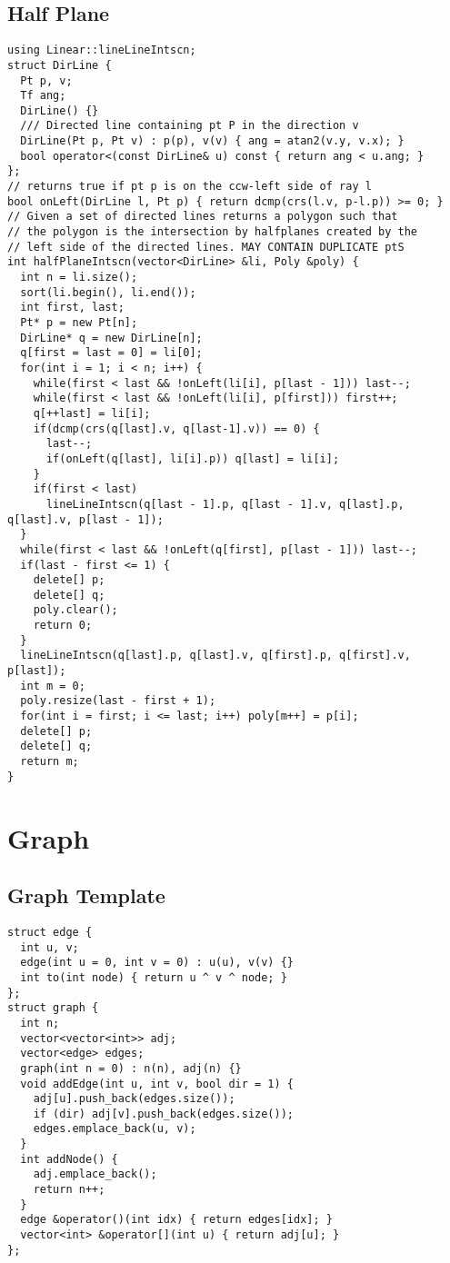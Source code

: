 \documentclass[FSZ,a4paper,onesided]{article}
\begin{document}
\begin{multicols*}{\COLS}
\subsection{Half Plane}
\begin{lstlisting}
using Linear::lineLineIntscn;
struct DirLine {
  Pt p, v;
  Tf ang;
  DirLine() {}
  /// Directed line containing pt P in the direction v
  DirLine(Pt p, Pt v) : p(p), v(v) { ang = atan2(v.y, v.x); }
  bool operator<(const DirLine& u) const { return ang < u.ang; }
};
// returns true if pt p is on the ccw-left side of ray l
bool onLeft(DirLine l, Pt p) { return dcmp(crs(l.v, p-l.p)) >= 0; }
// Given a set of directed lines returns a polygon such that
// the polygon is the intersection by halfplanes created by the
// left side of the directed lines. MAY CONTAIN DUPLICATE ptS
int halfPlaneIntscn(vector<DirLine> &li, Poly &poly) {
  int n = li.size();
  sort(li.begin(), li.end());
  int first, last;
  Pt* p = new Pt[n];
  DirLine* q = new DirLine[n];
  q[first = last = 0] = li[0];
  for(int i = 1; i < n; i++) {
    while(first < last && !onLeft(li[i], p[last - 1])) last--;
    while(first < last && !onLeft(li[i], p[first])) first++;
    q[++last] = li[i];
    if(dcmp(crs(q[last].v, q[last-1].v)) == 0) {
      last--;
      if(onLeft(q[last], li[i].p)) q[last] = li[i];
    }
    if(first < last)
      lineLineIntscn(q[last - 1].p, q[last - 1].v, q[last].p, q[last].v, p[last - 1]);
  }
  while(first < last && !onLeft(q[first], p[last - 1])) last--;
  if(last - first <= 1) {
    delete[] p;
    delete[] q;
    poly.clear();
    return 0;
  }
  lineLineIntscn(q[last].p, q[last].v, q[first].p, q[first].v, p[last]);
  int m = 0;
  poly.resize(last - first + 1);
  for(int i = first; i <= last; i++) poly[m++] = p[i];
  delete[] p;
  delete[] q;
  return m;
}
\end{lstlisting}
\section{Graph}
\subsection{Graph Template}
\begin{lstlisting}
struct edge {
  int u, v;
  edge(int u = 0, int v = 0) : u(u), v(v) {}
  int to(int node) { return u ^ v ^ node; }
};
struct graph {
  int n;
  vector<vector<int>> adj;
  vector<edge> edges;
  graph(int n = 0) : n(n), adj(n) {}
  void addEdge(int u, int v, bool dir = 1) {
    adj[u].push_back(edges.size());
    if (dir) adj[v].push_back(edges.size());
    edges.emplace_back(u, v);
  }
  int addNode() {
    adj.emplace_back();
    return n++;
  }
  edge &operator()(int idx) { return edges[idx]; }
  vector<int> &operator[](int u) { return adj[u]; }
};
\end{lstlisting}

\end{multicols*}
\end{document}
